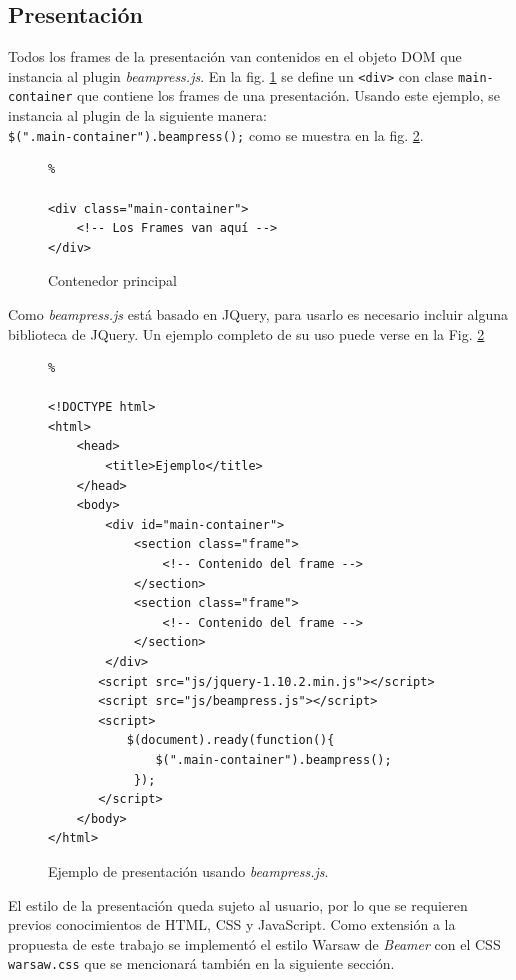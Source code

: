 		\subsection{Presentación} %
		\label{sub:presentacion}

			Todos los frames de la presentación van contenidos en el objeto DOM que instancia al plugin \textit{beampress.js}. En la fig. \ref{fig:main_container} se define un \texttt{<div>} con clase \texttt{main-container} que contiene los frames de una presentación. Usando este ejemplo, se instancia al plugin de la siguiente manera:\\ \texttt{\$(".main-container").beampress();} como se muestra en la fig. \ref{fig:ex5}.
		
			\begin{figure}[htb]%
				\begin{lstlisting}%

<div class="main-container">
	<!-- Los Frames van aquí -->
</div>
				\end{lstlisting}
			\caption{Contenedor principal}
			\label{fig:main_container}
			\end{figure}				


			Como \textit{beampress.js} está basado en JQuery, para usarlo es necesario incluir alguna biblioteca de JQuery. Un ejemplo completo de su uso puede verse en la Fig. \ref{fig:ex5}

			\begin{figure}[htb]%
				\begin{lstlisting}%

<!DOCTYPE html>
<html>
	<head>
    	<title>Ejemplo</title>
	</head>
	<body>
		<div id="main-container">
			<section class="frame">
				<!-- Contenido del frame -->
			</section>
			<section class="frame">
				<!-- Contenido del frame -->
			</section>						
		</div>
	   <script src="js/jquery-1.10.2.min.js"></script>
	   <script src="js/beampress.js"></script>
	   <script>
	       $(document).ready(function(){     
	           $(".main-container").beampress();
	        });
	   </script>		
	</body>
</html>			
				\end{lstlisting}
			\caption{
				Ejemplo de presentación usando \textit{beampress.js}. 
				\label{fig:ex5} }
			\end{figure}	

			El estilo de la presentación queda sujeto al usuario, por lo que se requieren previos conocimientos de HTML, CSS y JavaScript. Como extensión a la propuesta de este trabajo se implementó el estilo Warsaw de \textit{Beamer} con el CSS \texttt{warsaw.css} que se mencionará también en la siguiente sección.

